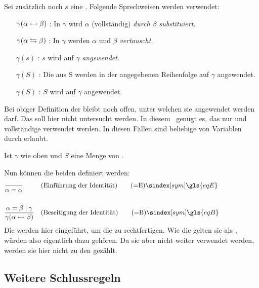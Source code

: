 {Sei zusätzlich noch $s$ eine .
Folgende Sprechweisen werden verwendet:
\begin{itemize}
	\renewcommand*{\itemindent}{1,5cm}
	\renewcommand*{\labelsep}{5pt}
	\item [$\gamma(\alpha \leftarrowtail \beta)$ :] In $\gamma$ wird $\alpha$ (vollständig) \emph{durch $\beta$ substituiert}.
	\item [$\gamma(\alpha \leftrightarrows \beta)$ :] In $\gamma$ werden $\alpha$ und $\beta$ \emph{vertauscht}.
	\item [$\gamma(s)$ :] $s$ wird auf $\gamma$ \emph{angewendet}.
	\item [$\gamma(S)$ :] Die  aus S werden in der angegebenen Reihenfolge auf $\gamma$ angewendet.
	\item [$\gamma(S)$ :] $S$ wird auf $\gamma$ angewendet.
\end{itemize}
%
Bei obiger Definition der  bleibt noch offen, unter welchen  sie angewendet werden darf. Das soll hier nicht untersucht werden. In diesem \sectionname\ genügt es, das nur  und vollständige  verwendet werden.
In diesen Fällen sind beliebige  von Variablen durch  erlaubt.

Ist $\gamma$ wie oben und $S$ eine Menge von .

Nun können die beiden  definiert werden:
\begin{align}
	& \frac{}{\alpha\eq\alpha}
	& & (\text{Einführung der Identität})
	\tag{\tageqE} \sym{\gls{eqE}} \label{def:eqE}
	\\\\
	& \frac{\alpha\eq\beta \srand \gamma}{\gamma(\alpha\subst\beta)}
	& & (\text{Beseitigung der Identität})
	\tag{\tageqB} \sym{\gls{eqB}} \label{def:eqB}
	\formulatoleft
\end{align}
%
Die  werden hier eingeführt, um die  zu rechtfertigen.
Wie die  gelten sie als , würden also eigentlich dazu gehören.
Da sie aber nicht weiter verwendet werden, werden sie hier nicht zu den  gezählt.

\subsection{Weitere Schlussregeln}%
\label{sub:weitereSchlussregeln}

}
